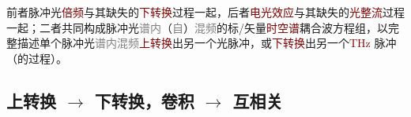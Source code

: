 前者\textcolor{NavyBlue}{脉冲光}\textcolor{Maroon}{倍频}与其缺失的\textcolor{Maroon}{下转换}过程一起，后者\textcolor{Maroon}{电光效应}与其缺失的\textcolor{Maroon}{光整流}过程一起；二者共同构成\textcolor{NavyBlue}{脉冲光}\textcolor{gray}{谱内}（\textcolor{gray}{自}）\textcolor{gray}{混频}的标/矢量\textcolor{Maroon}{时空谱}耦合波方程组，以完整描述单个\textcolor{NavyBlue}{脉冲光}\textcolor{gray}{谱内混频}\textcolor{Maroon}{上转换}出另一个\textcolor{NavyBlue}{光脉冲}，或\textcolor{Maroon}{下转换}出另一个\textcolor{Maroon}{THz} \textcolor{NavyBlue}{脉冲}（的过程）。

\subsection{上转换 $\to$ 下转换，卷积 $\to$ 互相关}\label{ssec:cross-correlation}

